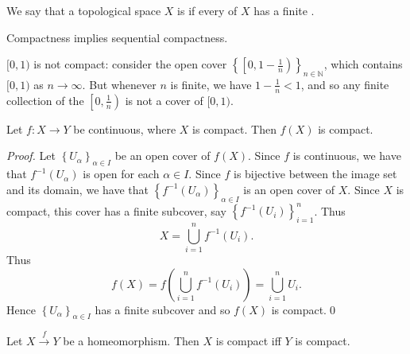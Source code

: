 \documentclass[notoc,notitlepage]{tufte-book}
\begin{document}
\begin{defn}[Compactness]\label{defn:compactness}
  We say that a topological space $X$ is  if every  
  of $X$ has a finite .
\end{defn}

\begin{lemma}\label{lemma:compactness_implies_sequential_compactness}
  Compactness implies sequential compactness.
\end{lemma}

\begin{eg}
  $[ 0, 1 )$ is not compact: consider the open cover 
  $\left\{ \left[ 0, 1 - \frac{1}{n} \right) \right\}_{n \in \mathbb{N}}$, which contains
  $[0, 1)$ as $n \to \infty$. But whenever $n$ is finite, we have $1 - \frac{1}{n} < 1$,
  and so any finite collection of the $\left[0, \frac{1}{n}\right)$ is not a cover of
  $[0, 1)$.
\end{eg}

\begin{thm}\label{thm:continuous_maps_map_compact_sets_to_compact_images}
  Let $f : X \to Y$ be continuous, where $X$ is compact. Then $f(X)$ is compact.
\end{thm}

\begin{proof}
  Let $\left\{ U_\alpha \right\}_{\alpha \in I}$ be an open cover of $f(X)$. Since
  $f$ is continuous, we have that $f^{-1} \left( U_\alpha \right)$ is open for each
  $\alpha \in I$. Since $f$ is bijective between the image set and its domain, we
  have that $\left\{ f^{-1} \left( U_\alpha \right) \right\}_{\alpha \in I}$ is an
  open cover of $X$. Since $X$ is compact, this cover has a finite subcover, say
  $\left\{ f^{-1} \left( U_i \right) \right\}_{i = 1}^{n}$. Thus
  \begin{equation*}
    X = \bigcup_{i=1}^{n} f^{-1} \left( U_i \right).
  \end{equation*}
  Thus
  \begin{equation*}
    f(X) = f \left( \bigcup_{i=1}^{n} f^{-1} \left( U_i \right) \right) = \bigcup_{i=1}^{n} U_i.
  \end{equation*}
  Hence $\left\{ U_\alpha \right\}_{\alpha \in I}$ has a finite subcover and so
  $f(X)$ is compact.\qed\
\end{proof}

\begin{crly}\label{crly:homeomorphic_maps_map_compact_sets_to_compact_sets}
  Let $X \overset{f}{\to} Y$ be a homeomorphism. Then $X$ is compact iff
  $Y$ is compact.
\end{crly}
\end{document}
